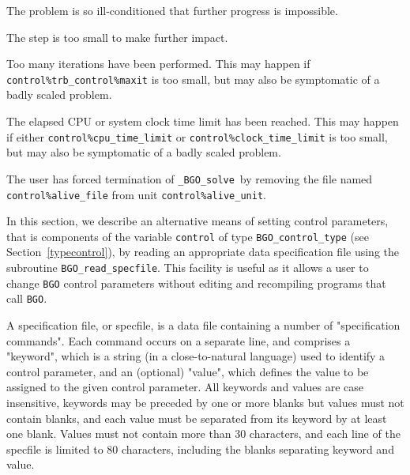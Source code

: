 \documentclass{galahad}
\newcommand{\packagename}{BGO}
\newcommand{\fullpackagename}{\libraryname\_\packagename}
\newcommand{\solver}{{\tt \fullpackagename\_solve}}
\begin{document}
\begin{description}
 The problem is so ill-conditioned that
  further progress is impossible.

 The step is too small to make further impact.

 Too many iterations have been performed.
  This may happen if
    {\tt control\%trb\_control\%maxit} is too small, but may also be
    symptomatic of a badly scaled problem.

 The elapsed CPU or system clock time limit has been
    reached. This may happen if either {\tt control\%cpu\_time\_limit} or
    {\tt control\%clock\_time\_limit} is too small, but may also be symptomatic
    of a badly scaled problem.

 The user has forced termination of \solver\
     by removing the file named {\tt control\%a\-live\_file} from
     unit {\tt control\%alive\_unit}.

\end{description}


\galfeatures
\noindent In this section, we describe an alternative means of setting
control parameters, that is components of the variable {\tt control} of type
{\tt \packagename\_control\_type}
(see Section~\ref{typecontrol}),
by reading an appropriate data specification file using the
subroutine {\tt \packagename\_read\_specfile}. This facility
is useful as it allows a user to change  {\tt \packagename} control parameters
without editing and recompiling programs that call {\tt \packagename}.

A specification file, or specfile, is a data file containing a number of
"specification commands". Each command occurs on a separate line,
and comprises a "keyword",
which is a string (in a close-to-natural language) used to identify a
control parameter, and
an (optional) "value", which defines the value to be assigned to the given
control parameter. All keywords and values are case insensitive,
keywords may be preceded by one or more blanks but
values must not contain blanks, and
each value must be separated from its keyword by at least one blank.
Values must not contain more than 30 characters, and
each line of the specfile is limited to 80 characters,
including the blanks separating keyword and value.
\end{document}
